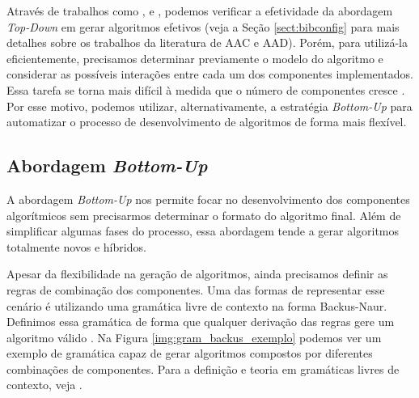 Através de trabalhos como \cite{khudabukhsh2016satenstein}, \cite{franzin2019revisiting} e \cite{ bezerra2020automatically}, podemos verificar a efetividade da abordagem \textit{Top-Down} em gerar algoritmos efetivos (veja a Seção \ref{sect:bibconfig} para mais detalhes sobre os trabalhos da literatura de \ac{AAC} e \ac{AAD}). Porém, para utilizá-la eficientemente, precisamos determinar previamente o modelo do algoritmo e considerar as possíveis interações entre cada um dos componentes implementados. Essa tarefa se torna mais difícil à medida que o número de componentes cresce \citep{mascia2014grammar}. Por esse motivo, podemos utilizar, alternativamente, a estratégia \textit{Bottom-Up} para automatizar o processo de desenvolvimento de algoritmos de forma mais flexível.





\subsection{Abordagem \textit{Bottom-Up}} \label{sect:bottomup}

A abordagem \textit{Bottom-Up} nos permite focar no desenvolvimento dos componentes algorítmicos sem precisarmos determinar o formato do algoritmo final. Além de simplificar algumas fases do processo, essa abordagem tende a gerar algoritmos totalmente novos e híbridos.

Apesar da flexibilidade na geração de algoritmos, ainda precisamos definir as regras de combinação dos componentes. Uma das formas de representar esse cenário é utilizando uma gramática livre de contexto na forma Backus-Naur. Definimos essa gramática de forma que qualquer derivação das regras gere um algoritmo válido \citep{mascia2013grammars}. Na Figura \ref{img:gram_backus_exemplo} podemos ver um exemplo de gramática capaz de gerar algoritmos compostos por diferentes combinações de componentes. Para a definição e teoria em gramáticas livres de contexto, veja \cite{papadimitriou1997elements}.

